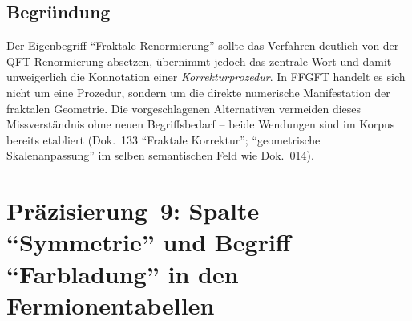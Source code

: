 \begin{center}
{\footnotesize
{}
}
\end{center}

\subsection*{Begründung}

Der Eigenbegriff \enquote{Fraktale Renormierung} sollte das Verfahren
deutlich von der QFT-Renormierung absetzen, übernimmt jedoch das
zentrale Wort und damit unweigerlich die Konnotation einer
\emph{Korrekturprozedur}. In FFGFT handelt es sich nicht um eine
Prozedur, sondern um die direkte numerische Manifestation der
fraktalen Geometrie. Die vorgeschlagenen Alternativen vermeiden
dieses Missverständnis ohne neuen Begriffsbedarf -- beide Wendungen
sind im Korpus bereits etabliert (Dok.~133 \enquote{Fraktale Korrektur};
\enquote{geometrische Skalenanpassung} im selben semantischen Feld
wie Dok.~014).

\section{\texorpdfstring{Präzisierung~9: Spalte \enquote{Symmetrie} und Begriff \enquote{Farbladung} in den Fermionentabellen}{Praezisierung 9: Spalte Symmetrie und Begriff Farbladung in den Fermionentabellen}}

